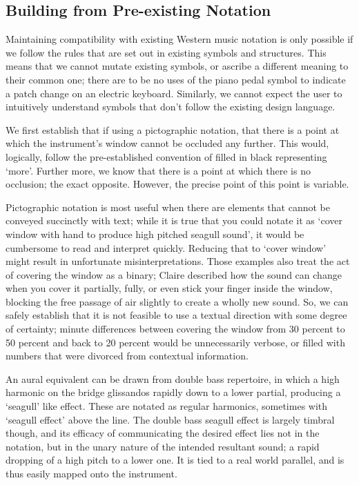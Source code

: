 \subsection{Building from Pre-existing Notation}

Maintaining compatibility with existing Western music notation is only possible if we follow the rules that are set out in existing symbols and structures.
This means that we cannot mutate existing symbols, or ascribe a different meaning to their common one; there are to be no uses of the piano pedal symbol to indicate a patch change on an electric keyboard.
Similarly, we cannot expect the user to intuitively understand symbols that don't follow the existing design language.

We first establish that if using a pictographic notation, that there is a point at which the instrument's window cannot be occluded any further. 
This would, logically, follow the pre-established convention of filled in black representing `more'. 
Further more, we know that there is a point at which there is no occlusion; the exact opposite. 
However, the precise point of this point is variable.

Pictographic notation is most useful when there are elements that cannot be conveyed succinctly with text; while it is true that you could notate it as `cover window with hand to produce high pitched seagull sound', it would be cumbersome to read and interpret quickly. 
Reducing that to `cover window' might result in unfortunate misinterpretations. 
Those examples also treat the act of covering the window as a binary; Claire described how the sound can change when you cover it partially, fully, or even stick your finger inside the window, blocking the free passage of air slightly to create a wholly new sound. 
So, we can safely establish that it is not feasible to use a textual direction with some degree of certainty; 
minute differences between covering the window from 30 percent to 50 percent and back to 20 percent would be unnecessarily verbose, or filled with numbers that were divorced from contextual information.

An aural equivalent can be drawn from double bass repertoire, in which a high harmonic on the bridge glissandos rapidly down to a lower partial, producing a `seagull' like effect. 
These are notated as regular harmonics, sometimes with `seagull effect' above the line. 
The double bass seagull effect is largely timbral though, and its efficacy of communicating the desired effect lies not in the notation, but in the unary nature of the intended resultant sound; a rapid dropping of a high pitch to a lower one. 
It is tied to a real world parallel, and is thus easily mapped onto the instrument.

